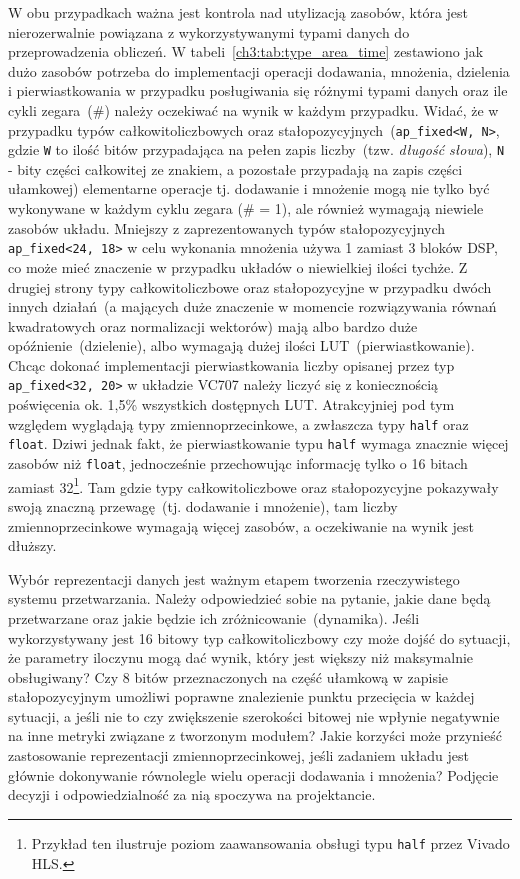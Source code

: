 W obu przypadkach ważna jest kontrola nad utylizacją zasobów, która jest nierozerwalnie powiązana z wykorzystywanymi typami danych do przeprowadzenia obliczeń. W tabeli~\ref{ch3:tab:type_area_time} zestawiono jak dużo zasobów potrzeba do implementacji operacji dodawania, mnożenia, dzielenia i pierwiastkowania w przypadku posługiwania się różnymi typami danych oraz ile cykli zegara~(\#) należy oczekiwać na wynik w każdym przypadku. Widać, że w przypadku typów całkowitoliczbowych oraz stałopozycyjnych~(\texttt{ap\_fixed<W, N>}, gdzie \texttt{W} to ilość bitów przypadająca na pełen zapis liczby~(tzw. \textit{długość słowa}), \texttt{N} - bity części całkowitej ze znakiem, a pozostałe przypadają na zapis części ułamkowej) elementarne operacje tj. dodawanie i mnożenie mogą nie tylko być wykonywane w każdym cyklu zegara (\# = 1), ale również wymagają niewiele zasobów układu. Mniejszy z zaprezentowanych typów stałopozycyjnych \texttt{ap\_fixed\textless{}24, 18\textgreater{}} w celu wykonania mnożenia używa 1 zamiast 3 bloków DSP, co może mieć znaczenie w przypadku układów o niewielkiej ilości tychże. Z drugiej strony typy całkowitoliczbowe oraz stałopozycyjne w przypadku dwóch innych działań~(a mających duże znaczenie w momencie rozwiązywania równań kwadratowych oraz normalizacji wektorów) mają albo bardzo duże opóźnienie~(dzielenie), albo wymagają dużej ilości LUT~(pierwiastkowanie). Chcąc dokonać implementacji pierwiastkowania liczby opisanej przez typ \texttt{ap\_fixed\textless{}32, 20\textgreater{}} w układzie VC707 należy liczyć się z koniecznością poświęcenia ok. 1,5\% wszystkich dostępnych LUT. Atrakcyjniej pod tym względem wyglądają typy zmiennoprzecinkowe, a zwłaszcza typy \texttt{half} oraz \texttt{float}. Dziwi jednak fakt, że pierwiastkowanie typu \texttt{half} wymaga znacznie więcej zasobów niż \texttt{float}, jednocześnie przechowując informację tylko o 16 bitach zamiast 32\footnote{Przykład ten ilustruje poziom zaawansowania obsługi typu \texttt{half} przez Vivado HLS.}. Tam gdzie typy całkowitoliczbowe oraz stałopozycyjne pokazywały swoją znaczną przewagę~(tj. dodawanie i mnożenie), tam liczby zmiennoprzecinkowe wymagają więcej zasobów, a oczekiwanie na wynik jest dłuższy.  

Wybór reprezentacji danych jest ważnym etapem tworzenia rzeczywistego systemu przetwarzania. Należy odpowiedzieć sobie na pytanie, jakie dane będą przetwarzane oraz jakie będzie ich zróżnicowanie~(dynamika). Jeśli wykorzystywany jest 16 bitowy typ całkowitoliczbowy czy może dojść do sytuacji, że parametry iloczynu mogą dać wynik, który jest większy niż maksymalnie obsługiwany? Czy 8 bitów przeznaczonych na część ułamkową w zapisie stałopozycyjnym umożliwi poprawne znalezienie punktu przecięcia w każdej sytuacji, a jeśli nie to czy zwiększenie szerokości bitowej nie wpłynie negatywnie na inne metryki związane z tworzonym modułem? Jakie korzyści może przynieść zastosowanie reprezentacji zmiennoprzecinkowej, jeśli zadaniem układu jest głównie dokonywanie równolegle wielu operacji dodawania i mnożenia?  Podjęcie decyzji i odpowiedzialność za nią spoczywa na projektancie.

